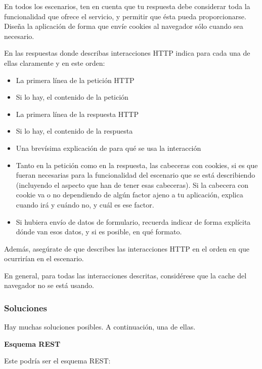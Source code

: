En todos los escenarios, ten en cuenta que tu respuesta debe considerar toda la funcionalidad que ofrece el servicio, y permitir que ésta pueda proporcionarse. Diseña la aplicación de forma que envíe cookies al navegador sólo cuando sea necesario.

En las respuestas donde describas interacciones HTTP indica para cada una de ellas claramente y en este orden:
  \begin{itemize}
  \item La primera línea de la petición HTTP
  \item Si lo hay, el contenido de la petición
  \item La primera línea de la respuesta HTTP
  \item Si lo hay, el contenido de la respuesta
  \item Una brevísima explicación de para qué se usa la interacción
  \item Tanto en la petición como en la respuesta, las cabeceras con cookies, si es que fueran necesarias para la funcionalidad del escenario que se está describiendo (incluyendo el aspecto que han de tener esas cabeceras). Si la cabecera con cookie va o no dependiendo de algún factor ajeno a tu aplicación, explica cuando irá y cuándo no, y cuál es ese factor.
  \item Si hubiera envío de datos de formulario, recuerda indicar de forma explícita dónde van esos datos, y si es posible, en qué formato.
  \end{itemize}

Además, asegúrate de que describes las interacciones HTTP en el orden en que ocurrirían en el escenario.

En general, para todas las interacciones descritas, considérese que la cache del navegador no se está usando.

\subsubsection{Soluciones}

Hay muchas soluciones posibles. A continuación, una de ellas.

\textbf{Esquema REST}

Este podría ser el esquema REST:

